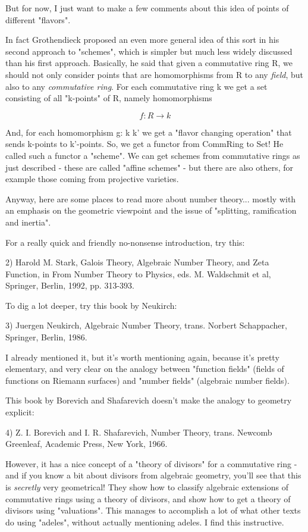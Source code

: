 But for now, I just want to make a few comments about this idea of 
points of different "flavors".  

In fact Grothendieck proposed an even more general idea of this sort in
his second approach to "schemes", which is simpler but much less widely
discussed than his first approach.  Basically, he said that given a
commutative ring R, we should not only consider points that are  
homomorphisms from R to any \emph{field}, but also to any
\emph{commutative ring}.
For each commutative ring k we get a set consisting of 
all "k-points"
of R, namely homomorphisms 


$$

f: R \to  k
$$
    
And, for each homomorphism g: k \to  k' we get a "flavor changing
operation" that sends k-points to k'-points.  So, we get a functor
from CommRing to Set!  He called such a functor a "scheme".  We can 
get schemes from commutative rings as just described - these are called
"affine schemes" - but there are also others, for example those 
coming from projective varieties.  

Anyway, here are some places to read more about number theory... mostly 
with an emphasis on the geometric viewpoint and the issue of "splitting,
ramification and inertia".

For a really quick and friendly no-nonsense introduction, try this:

2) Harold M. Stark, Galois Theory, Algebraic Number Theory, and Zeta
Function, in From Number Theory to Physics, eds. M. Waldschmit et al, 
Springer, Berlin, 1992, pp. 313-393.

To dig a lot deeper, try this book by Neukirch:

3) Juergen Neukirch, Algebraic Number Theory, trans. Norbert 
Schappacher, Springer, Berlin, 1986. 

I already mentioned it, but it's worth mentioning again, because it's 
pretty elementary, and very clear on the analogy between "function 
fields" (fields of functions on Riemann surfaces) and "number 
fields" (algebraic number fields).  

This book by Borevich and Shafarevich doesn't make the analogy to 
geometry explicit:

4) Z. I. Borevich and I. R. Shafarevich, Number Theory, trans.
Newcomb Greenleaf, Academic Press, New York, 1966.

However, it has a nice concept of a "theory of divisors" for a 
commutative ring - and if you know a bit about divisors from algebraic 
geometry, you'll see that this is \emph{secretly} very geometrical!  They
show how to classify algebraic extensions of commutative rings using 
a theory of divisors, and show how to get a theory of divisors using 
"valuations".  This manages to accomplish a lot of what other 
texts do 
using "adeles", without actually mentioning adeles.  I find this 
instructive. 

